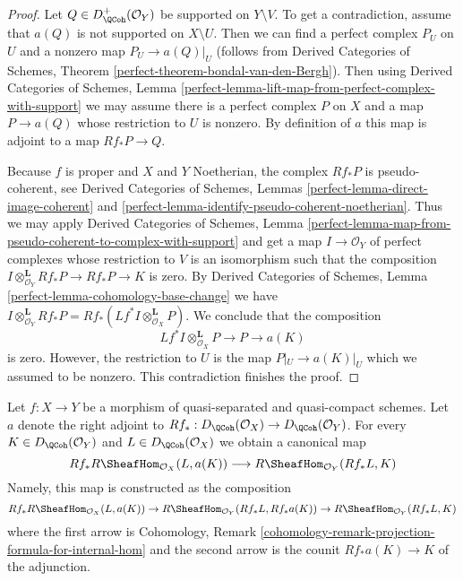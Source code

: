 \begin{proof}
Let $Q \in D^+_\QCoh(\mathcal{O}_Y)$ be supported on $Y \setminus V$.
To get a contradiction, assume that $a(Q)$ is not supported on
$X \setminus U$. Then we can find a perfect complex $P_U$ on $U$
and a nonzero map $P_U \to a(Q)|_U$ (follows from
Derived Categories of Schemes, Theorem
\ref{perfect-theorem-bondal-van-den-Bergh}). Then using
Derived Categories of Schemes, Lemma
\ref{perfect-lemma-lift-map-from-perfect-complex-with-support}
we may assume there is a perfect complex $P$ on $X$ and a map
$P \to a(Q)$ whose restriction to $U$ is nonzero.
By definition of $a$ this map
is adjoint to a map $Rf_*P \to Q$.

\medskip\noindent
Because $f$ is proper and $X$ and $Y$ Noetherian, the complex
$Rf_*P$ is pseudo-coherent, see
Derived Categories of Schemes, Lemmas
\ref{perfect-lemma-direct-image-coherent} and
\ref{perfect-lemma-identify-pseudo-coherent-noetherian}.
Thus we may apply
Derived Categories of Schemes, Lemma
\ref{perfect-lemma-map-from-pseudo-coherent-to-complex-with-support}
and get a map $I \to \mathcal{O}_Y$ of perfect complexes
whose restriction to $V$ is an isomorphism such that the composition
$I \otimes^\mathbf{L}_{\mathcal{O}_Y} Rf_*P \to Rf_*P \to K$ is zero.
By Derived Categories of Schemes, Lemma
\ref{perfect-lemma-cohomology-base-change}
we have $I \otimes^\mathbf{L}_{\mathcal{O}_Y} Rf_*P =
Rf_*(Lf^*I \otimes^\mathbf{L}_{\mathcal{O}_X} P)$.
We conclude that the composition
$$
Lf^*I \otimes^\mathbf{L}_{\mathcal{O}_X} P \to P \to a(K)
$$
is zero. However, the restriction to $U$ is the map
$P|_U \to a(K)|_U$ which we assumed to be nonzero.
This contradiction finishes the proof.
\end{proof}

\noindent
Let $f : X \to Y$ be a morphism of quasi-separated and quasi-compact
schemes. Let $a$ denote the right adjoint to
$Rf_* : D_\QCoh(\mathcal{O}_X) \to D_\QCoh(\mathcal{O}_Y)$. For every
$K \in D_\QCoh(\mathcal{O}_Y)$ and $L \in D_\QCoh(\mathcal{O}_X)$
we obtain a canonical map
\begin{equation}
\label{equation-sheafy-trace}
Rf_*R\SheafHom_{\mathcal{O}_X}(L, a(K))
\longrightarrow
R\SheafHom_{\mathcal{O}_Y}(Rf_*L, K)
\end{equation}
Namely, this map is constructed as the composition
$$
Rf_*R\SheafHom_{\mathcal{O}_X}(L, a(K)) \to
R\SheafHom_{\mathcal{O}_Y}(Rf_*L, Rf_*a(K)) \to
R\SheafHom_{\mathcal{O}_Y}(Rf_*L, K)
$$
where the first arrow is 
Cohomology, Remark
\ref{cohomology-remark-projection-formula-for-internal-hom}
and the second arrow is the counit $Rf_*a(K) \to K$ of the adjunction.

